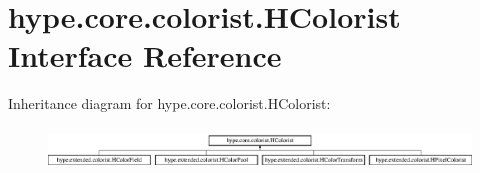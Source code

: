 \hypertarget{interfacehype_1_1core_1_1colorist_1_1_h_colorist}{\section{hype.\-core.\-colorist.\-H\-Colorist Interface Reference}
\label{interfacehype_1_1core_1_1colorist_1_1_h_colorist}
}
Inheritance diagram for hype.\-core.\-colorist.\-H\-Colorist\-:\begin{figure}[H]
\begin{center}
\leavevmode
\includegraphics[height=1.124498cm]{interfacehype_1_1core_1_1colorist_1_1_h_colorist}
\end{center}
\end{figure}
